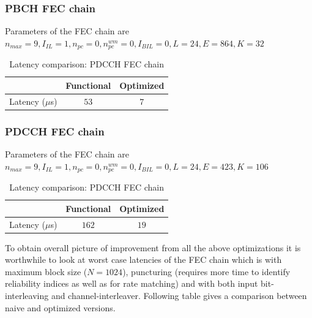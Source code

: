\subsubsection{PBCH FEC chain}
Parameters of the FEC chain are \newline
$n_{max} = 9, I_{IL} = 1, n_{pc} = 0, n_{pc}^{wm} = 0, I_{BIL} = 0, L = 24, E = 864, K = 32$
\begin{table}[h]
	\begin{center}
		\caption{Latency comparison: PDCCH FEC chain}
		\label{tab:pbchFecChain}
		\begin{tabular}{c|c|c} %
			\textbf{ } & Functional & Optimized \\
			\hline
			Latency ($\mu$s) & $53$ & $7$\\
		\end{tabular}
	\end{center}
\end{table}


\subsubsection{PDCCH FEC chain}
Parameters of the FEC chain are \newline
$n_{max} = 9, I_{IL} = 1, n_{pc} = 0, n_{pc}^{wm} = 0, I_{BIL} = 0, L = 24, E = 423, K = 106$
\begin{table}[h]
	\begin{center}
		\caption{Latency comparison: PDCCH FEC chain}
		\label{tab:pdcchFecChain}
		\begin{tabular}{c|c|c} %
			\textbf{ } & Functional & Optimized \\
			\hline
			Latency ($\mu$s) & $162$ & $19$\\
		\end{tabular}
	\end{center}
\end{table}


To obtain overall picture of improvement from all the above optimizations it is worthwhile to look at worst case latencies of the FEC chain which is with maximum block size ($N = 1024$), puncturing (requires more time to identify reliability indices as well as for rate matching) and with both input bit-interleaving and channel-interleaver. Following table gives a comparison between naive and optimized versions.

